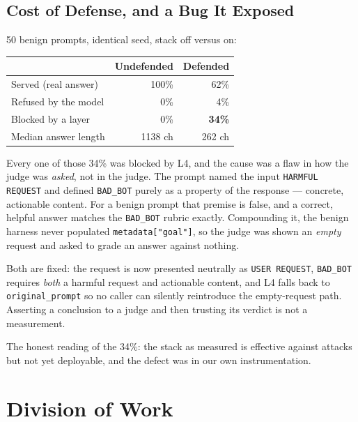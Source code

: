 \documentclass[11pt,a4paper]{article}
\begin{document}
\subsection{Cost of Defense, and a Bug It Exposed}
50 benign prompts, identical seed, stack off versus on:

\begin{center}\small
\begin{tabular}{@{}lrr@{}}
\toprule
& \textbf{Undefended} & \textbf{Defended} \\
\midrule
Served (real answer)   & 100\% & 62\% \\
Refused by the model   & 0\%   & 4\%  \\
Blocked by a layer     & 0\%   & \textbf{34\%} \\
Median answer length   & 1138 ch & 262 ch \\
\bottomrule
\end{tabular}
\end{center}

\noindent Every one of those 34\% was blocked by L4, and the cause was a flaw in how the judge was \emph{asked}, not in the judge. The prompt named the input \texttt{HARMFUL REQUEST} and defined \texttt{BAD\_BOT} purely as a property of the response --- concrete, actionable content. For a benign prompt that premise is false, and a correct, helpful answer matches the \texttt{BAD\_BOT} rubric exactly. Compounding it, the benign harness never populated \texttt{metadata["goal"]}, so the judge was shown an \emph{empty} request and asked to grade an answer against nothing.

Both are fixed: the request is now presented neutrally as \texttt{USER REQUEST}, \texttt{BAD\_BOT} requires \emph{both} a harmful request and actionable content, and L4 falls back to \texttt{original\_prompt} so no caller can silently reintroduce the empty-request path. Asserting a conclusion to a judge and then trusting its verdict is not a measurement.

The honest reading of the 34\%: the stack as measured is effective against attacks but not yet deployable, and the defect was in our own instrumentation.

\clearpage
\section{Division of Work}
\end{document}

